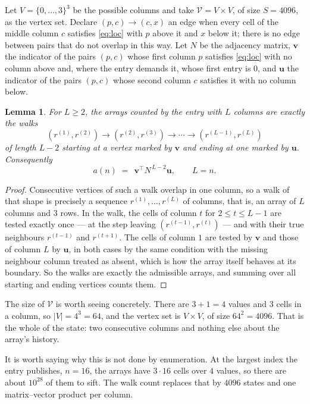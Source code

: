 \documentclass[11pt,a4paper]{article}
\theoremstyle{plain}
\newtheorem{lemma}[theorem]{Lemma}
\theoremstyle{definition}
\begin{document}
Let $V=\{0,\dots,3\}^{3}$ be the possible columns and take
$\mathcal V=V\times V$, of size $S=4096$, as the vertex set. Declare $(p,c)\to(c,x)$ an edge
when every cell of the middle column $c$ satisfies \eqref{eq:loc} with $p$ above it and $x$
below it; there is no edge between pairs that do not overlap in this way. Let $N$ be the
adjacency matrix, $\mathbf{v}$ the indicator of the pairs $(p,c)$ whose first column $p$
satisfies \eqref{eq:loc} with no column above and, where the entry demands it, whose first entry is $0$, and $\mathbf{u}$ the indicator of
the pairs $(p,c)$ whose second column $c$ satisfies it with no column below.

\begin{lemma}\label{lem:walk}
For $L\ge2$, the arrays counted by the entry with $L$ columns are exactly the walks
\[
(r^{(1)},r^{(2)})\to(r^{(2)},r^{(3)})\to\cdots\to(r^{(L-1)},r^{(L)})
\]
of length $L-2$ starting at a vertex marked by $\mathbf{v}$ and ending at one marked by
$\mathbf{u}$. Consequently
\[
a(n)\;=\;\,\mathbf{v}^{\!\top}N^{\,L-2}\mathbf{u},\qquad L=n .
\]
\end{lemma}

\begin{proof}
Consecutive vertices of such a walk overlap in one column, so a walk of that shape is
precisely a sequence $r^{(1)},\dots,r^{(L)}$ of columns, that is, an array of $L$ columns
and $3$ rows. In the walk, the cells of column $t$ for $2\le t\le L-1$ are tested
exactly once --- at the step leaving $(r^{(t-1)},r^{(t)})$ --- and with their true
neighbours $r^{(t-1)}$ and $r^{(t+1)}$. The cells of column $1$ are tested by
$\mathbf{v}$ and those of column $L$ by $\mathbf{u}$, in both cases by the same condition
with the missing neighbour column treated as absent, which is how the array itself behaves at
its boundary. So the walks are exactly the admissible arrays, and summing over all starting
and ending vertices counts them.
\end{proof}


The size of $\mathcal V$ is worth seeing concretely. There are $3+1=4$ values
and $3$ cells in a column, so $|V|=4^{3}=64$, and the vertex set is
$V\times V$, of size $64^2=4096$. That is the whole of the state: two consecutive
columns and nothing else about the array's history.

It is worth saying why this is not done by enumeration. At the largest index the entry
publishes, $n=16$, the arrays have $3\cdot16$ cells over
$4$ values, so there are about $10^{28}$ of them to sift. The
walk count replaces that by $4096$ states and one matrix--vector product per column.
\end{document}

